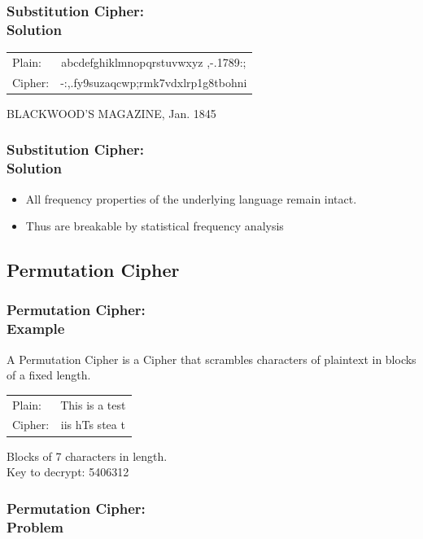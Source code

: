 \documentclass{uva-inf-presentation}
\begin{document}
\begin{frame}
\frametitle{Substitution Cipher:\\ Solution}
    \begin{table}
    \begin{tabular}{lc}
        Plain:  & abcdefghiklmnopqrstuvwxyz ,-.1789:;\\
        Cipher: & -:,.fy9suzaqcwp;rmk7vdxlrp1g8tbohni
    \end{tabular}
    \end{table}
    BLACKWOOD'S MAGAZINE, Jan. 1845
\end{frame}

\begin{frame}
\frametitle{Substitution Cipher:\\ Solution}
\begin{itemize}
    \item All frequency properties of the underlying language remain intact.
    \item Thus are breakable by statistical frequency analysis
\end{itemize}
\end{frame}

\subsection{Permutation Cipher}
\frame{\tableofcontents[currentsubsection]}

\begin{frame}
\frametitle{Permutation Cipher:\\ Example}
A Permutation Cipher is a Cipher that scrambles characters of plaintext in
blocks of a fixed length.\\

\begin{table}
    \begin{tabular}{lc}
        Plain:  & This is a test\\
        Cipher: & iis hTs stea t
    \end{tabular}
\end{table}

Blocks of 7 characters in length.\\
Key to decrypt: 5406312\\
\end{frame}

\begin{frame}
\frametitle{Permutation Cipher:\\ Problem}
\vspace{-30pt}


\end{frame}
\end{document}
